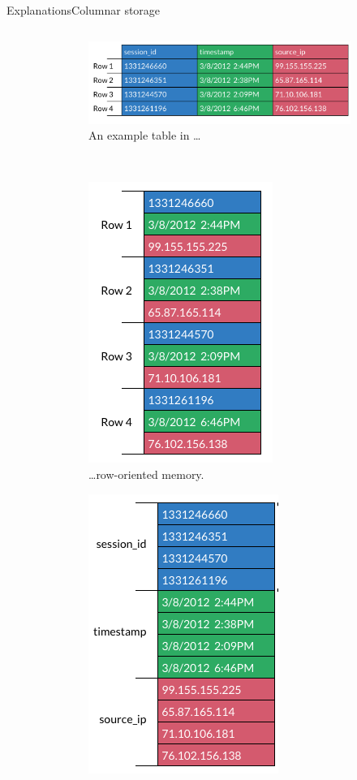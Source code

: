 \begin{frame}[t]{Explanations}{Columnar storage}
\begin{columns}[t]
\begin{column}[t]{0.4\linewidth}
\begin{itemize}
			\end{itemize}
		\end{column}
		\hfill
		\begin{column}{0.6\linewidth}
			\begin{figure}
				\centering
				\begin{subfigure}{0.8\linewidth}
					\centering
					\includegraphics[height=0.2\FrameHeight]{assets/table-example}
					\caption{An example table in \dots}
				\end{subfigure}
				\\
				\begin{subfigure}{0.4\linewidth}
					\centering
					\includegraphics[height=0.3\FrameHeight]{assets/table-row}
					\caption{\dots row-oriented memory.}
				\end{subfigure}
				\begin{subfigure}{0.4\linewidth}
					\centering
					\includegraphics[height=0.3\FrameHeight]{assets/table-columnar}

\end{subfigure}
\end{figure}
\end{column}
\end{columns}
\end{frame}

